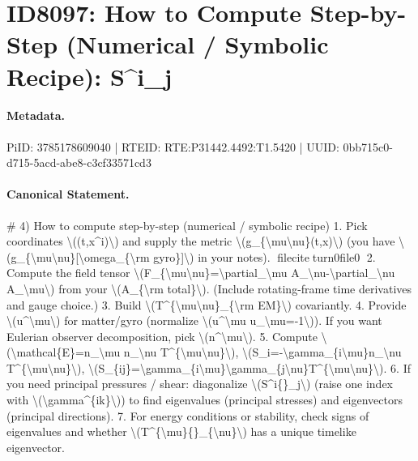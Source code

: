 \section*{ID8097: How to Compute Step-by-Step (Numerical / Symbolic Recipe): S\textasciicircum{}i\_j}
\paragraph{Metadata.}
PiID: 3785178609040 | RTEID: RTE:P31442.4492:T1.5420 | UUID: 0bb715c0-d715-5acd-abe8-c3cf33571cd3

\paragraph{Canonical Statement.}
\# 4) How to compute step-by-step (numerical / symbolic recipe) 1. Pick coordinates \textbackslash{}((t,x\textasciicircum{}i)\textbackslash{}) and supply the metric \textbackslash{}(g\_\{\textbackslash{}mu\textbackslash{}nu\}(t,x)\textbackslash{}) (you have \textbackslash{}(g\_\{\textbackslash{}mu\textbackslash{}nu\}[\textbackslash{}omega\_\{\textbackslash{}rm gyro\}]\textbackslash{}) in your notes). fileciteturn0file0 2. Compute the field tensor \textbackslash{}(F\_\{\textbackslash{}mu\textbackslash{}nu\}=\textbackslash{}partial\_\textbackslash{}mu A\_\textbackslash{}nu-\textbackslash{}partial\_\textbackslash{}nu A\_\textbackslash{}mu\textbackslash{}) from your \textbackslash{}(A\_\{\textbackslash{}rm total\}\textbackslash{}). (Include rotating-frame time derivatives and gauge choice.) 3. Build \textbackslash{}(T\textasciicircum{}\{\textbackslash{}mu\textbackslash{}nu\}\_\{\textbackslash{}rm EM\}\textbackslash{}) covariantly. 4. Provide \textbackslash{}(u\textasciicircum{}\textbackslash{}mu\textbackslash{}) for matter/gyro (normalize \textbackslash{}(u\textasciicircum{}\textbackslash{}mu u\_\textbackslash{}mu=-1\textbackslash{})). If you want Eulerian observer decomposition, pick \textbackslash{}(n\textasciicircum{}\textbackslash{}mu\textbackslash{}). 5. Compute \textbackslash{}(\textbackslash{}mathcal\{E\}=n\_\textbackslash{}mu n\_\textbackslash{}nu T\textasciicircum{}\{\textbackslash{}mu\textbackslash{}nu\}\textbackslash{}), \textbackslash{}(S\_i=-\textbackslash{}gamma\_\{i\textbackslash{}mu\}n\_\textbackslash{}nu T\textasciicircum{}\{\textbackslash{}mu\textbackslash{}nu\}\textbackslash{}), \textbackslash{}(S\_\{ij\}=\textbackslash{}gamma\_\{i\textbackslash{}mu\}\textbackslash{}gamma\_\{j\textbackslash{}nu\}T\textasciicircum{}\{\textbackslash{}mu\textbackslash{}nu\}\textbackslash{}). 6. If you need principal pressures / shear: diagonalize \textbackslash{}(S\textasciicircum{}i\{\}\_j\textbackslash{}) (raise one index with \textbackslash{}(\textbackslash{}gamma\textasciicircum{}\{ik\}\textbackslash{})) to find eigenvalues (principal stresses) and eigenvectors (principal directions). 7. For energy conditions or stability, check signs of eigenvalues and whether \textbackslash{}(T\textasciicircum{}\{\textbackslash{}mu\}\{\}\_\{\textbackslash{}nu\}\textbackslash{}) has a unique timelike eigenvector.


